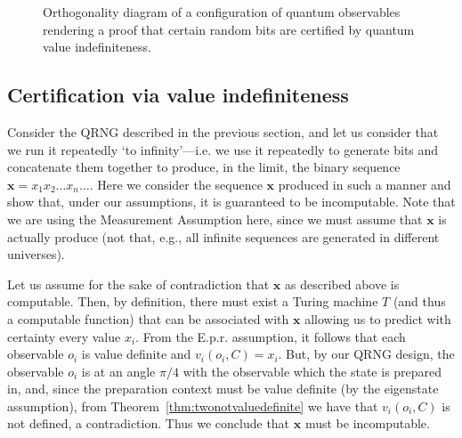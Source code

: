 \documentclass[11pt, a4paper]{article}
\theoremstyle{definition}
\newcommand{\ket}[1]{\left| #1 \right>}
\newcommand{\seq}[1]{\mathbf{#1}}
\begin{document}
\begin{figure}
\begin{center}
\end{center}
\caption{Orthogonality diagram of a configuration of quantum observables rendering a proof that certain random bits are certified by quantum value indefiniteness.}
\label{fig:greechie}
\end{figure}
\fi

\subsection{Certification via value indefiniteness}

Consider the QRNG
described in the previous section, and let us consider that we run it repeatedly `to infinity'---i.e. we use it repeatedly to generate bits and concatenate them together to produce, in the limit, the binary sequence $\seq{x}=x_1 x_2 \dots x_n \dots$.
Here we consider the sequence $\seq{x}$ produced in such a manner and show that, under our assumptions, it is guaranteed to be incomputable.
Note that we are using the Measurement Assumption here, since we must assume that $\seq{x}$ is actually produce (not that, e.g., all infinite sequences are generated in different universes).

Let us assume for the sake of contradiction that $\seq{x}$ as described above is computable.
Then, by definition, there must exist a Turing machine $T$ (and thus a computable function) that can be associated with $\seq{x}$ allowing us to predict with certainty every value $x_i$.
From the E.p.r. assumption, it follows that each observable $o_i$ is value definite and $v_i(o_i,C)=x_i$.
But, by our QRNG design, the observable $o_i$ is at an angle $\pi/4$ with the observable which the state is prepared in, and, since the preparation context must be value definite (by the eigenstate assumption), from Theorem~\ref{thm:twonotvaluedefinite} we have that $v_i(o_i,C)$ is not defined, a contradiction.
Thus we conclude that $\seq{x}$ must be incomputable.
\end{document}
